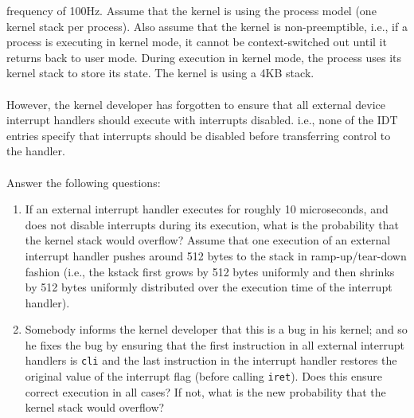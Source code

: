 \begin{enumerate}
frequency of 100Hz. Assume that the kernel is using the process model (one kernel
stack per process). Also assume that the kernel is non-preemptible, i.e., if a process
is executing in kernel mode, it cannot be context-switched out until it returns back to
user mode. During execution in kernel mode, the process uses its kernel stack to store
its state. The kernel is using a 4KB stack.\\\\
However, the kernel developer has forgotten to ensure that all external device interrupt
handlers should execute with interrupts disabled. i.e., none of the IDT entries specify
that interrupts should be disabled before transferring control to the handler.\\\\
Answer the following questions:
\begin{enumerate}
\item If an external interrupt handler executes for roughly 10 microseconds, and does
not disable interrupts during its execution, what is the probability that the kernel
stack would overflow? Assume that one execution
of an external interrupt handler pushes around 512 bytes to the stack in ramp-up/tear-down
fashion (i.e., the kstack first grows by 512 bytes uniformly and then shrinks by 512
bytes uniformly distributed over the execution time of the interrupt handler).
\item Somebody informs the kernel developer that this is a bug in his kernel; and so he
fixes the bug by ensuring that the first instruction in all external interrupt handlers
is {\tt cli} and the last instruction in the interrupt handler
restores the original value of the interrupt flag (before calling {\tt iret}). Does this
ensure correct execution in all cases? If not, what is the new probability that the
kernel stack would overflow?
\end{enumerate}


\end{enumerate}
